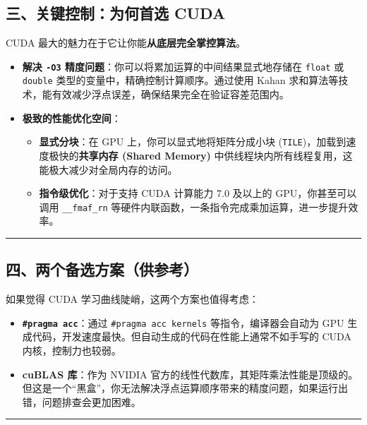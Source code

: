 \documentclass[11pt, a4paper]{article}
\begin{document}
\begin{aibox}
\subsection*{三、关键控制：为何首选 CUDA}

CUDA 最大的魅力在于它让你能\textbf{从底层完全掌控算法}。

\begin{itemize}
    \item \textbf{解决 \texttt{-O3} 精度问题}：你可以将累加运算的中间结果显式地存储在 \texttt{float} 或 \texttt{double} 类型的变量中，精确控制计算顺序。通过使用 Kahan 求和算法等技术，能有效减少浮点误差，确保结果完全在验证容差范围内。
    \item \textbf{极致的性能优化空间}：
    \begin{itemize}
        \item \textbf{显式分块}：在 GPU 上，你可以显式地将矩阵分成小块 (\texttt{TILE})，加载到速度极快的\textbf{共享内存 (Shared Memory)} 中供线程块内所有线程复用，这能极大减少对全局内存的访问。
        \item \textbf{指令级优化}：对于支持 CUDA 计算能力 7.0 及以上的 GPU，你甚至可以调用 \texttt{\_\_fmaf\_rn} 等硬件内联函数，一条指令完成乘加运算，进一步提升效率。
    \end{itemize}
\end{itemize}

\begin{center}\rule{\textwidth}{0.4pt}\end{center}

\subsection*{四、两个备选方案（供参考）}

如果觉得 CUDA 学习曲线陡峭，这两个方案也值得考虑：

\begin{itemize}
    \item \textbf{\texttt{\#pragma acc}}：通过 \texttt{\#pragma acc kernels} 等指令，编译器会自动为 GPU 生成代码，开发速度最快。但自动生成的代码在性能上通常不如手写的 CUDA 内核，控制力也较弱。
    \item \textbf{cuBLAS 库}：作为 NVIDIA 官方的线性代数库，其矩阵乘法性能是顶级的。但这是一个“黑盒”，你无法解决浮点运算顺序带来的精度问题，如果运行出错，问题排查会更加困难。
\end{itemize}

\begin{center}\rule{\textwidth}{0.4pt}\end{center}


\end{aibox}
\end{document}
